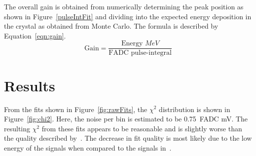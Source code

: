 \documentclass[twoside]{article}
\begin{document}
The overall gain is obtained from numerically determining the peak position as shown in Figure~\ref{pulseIntFit} and dividing into the expected energy deposition in the crystal as obtained from Monte Carlo. The formula is described by Equation~\eqref{eqn:gain}.
\begin{equation}
  \textrm{Gain} = \dfrac{\textrm{Energy }MeV}{\textrm{FADC pulse-integral}}
  \label{eqn:gain}
\end{equation}

\section{Results}
From the fits shown in Figure~\ref{fig:rawFits}, the $\chi^2$ distribution is shown in Figure~\ref{fig:chi2}. Here, the noise per bin is estimated to be 0.75~FADC mV. The resulting $\chi^2$ from these fits appears to be reasonable and is slightly worse than the quality described by~\cite{baltzell_ecal_2015}. The decrease in fit quality is most likely due to the low energy of the signals when compared to the signals in~\cite{baltzell_ecal_2015}.
\end{document}

